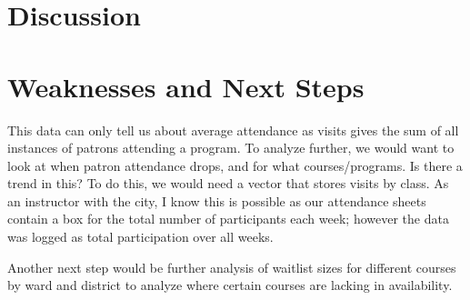 \documentclass[
  letterpaper,
  DIV=11,
  numbers=noendperiod]{scrartcl}
\begin{document}
\section{Discussion}\label{discussion-1}

\section{Weaknesses and Next Steps}\label{weaknesses-and-next-steps}

This data can only tell us about average attendance as visits gives the
sum of all instances of patrons attending a program. To analyze further,
we would want to look at when patron attendance drops, and for what
courses/programs. Is there a trend in this? To do this, we would need a
vector that stores visits by class. As an instructor with the city, I
know this is possible as our attendance sheets contain a box for the
total number of participants each week; however the data was logged as
total participation over all weeks.

Another next step would be further analysis of waitlist sizes for
different courses by ward and district to analyze where certain courses
are lacking in availability.
\end{document}
